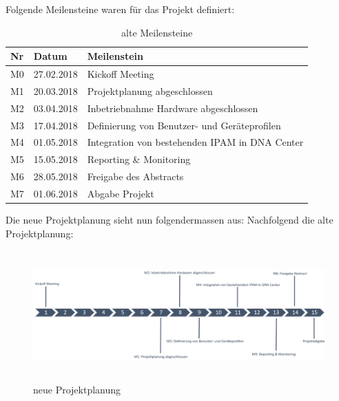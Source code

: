 Folgende Meilensteine waren für das Projekt definiert:
\begin{table}[H]
	\centering
	\begin{tabularx}{\textwidth}{p{1cm}| p{2.5cm}| X}
		\rowcolor{gray!50}
		\textbf{Nr} & \textbf{Datum} & \textbf{Meilenstein} \\
		\hline	
		M0 & 27.02.2018 & Kickoff Meeting \\
		M1 & 20.03.2018 & Projektplanung abgeschlossen \\
		M2 & 03.04.2018 & Inbetriebnahme Hardware abgeschlossen \\
		M3 & 17.04.2018 & Definierung von Benutzer- und Geräteprofilen \\
		M4 & 01.05.2018 & Integration von bestehenden IPAM in DNA Center \\
		M5 & 15.05.2018 & Reporting \& Monitoring \\
		M6 & 28.05.2018 & Freigabe des Abstracts \\
		M7 & 01.06.2018 & Abgabe Projekt \\
	\end{tabularx}
	\caption{alte Meilensteine}
	\label{tab:alte Meilensteine}
\end{table}

Die neue Projektplanung sieht nun folgendermassen aus:
Nachfolgend die alte Projektplanung:
\begin{figure}[H]
	\centering
	\includegraphics[height=5cm]{img/ZeitlichePlanung_v3.png}
	\caption{neue Projektplanung}
	\label{fig:neue Projektplanung}
\end{figure} 



